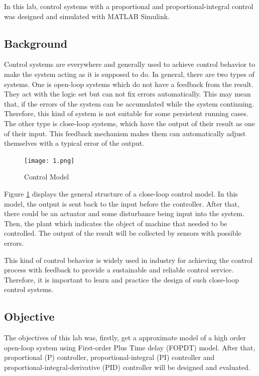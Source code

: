 \documentclass[11pt, a4paper]{article}
\begin{document}
In this lab, control systems with a proportional and proportional-integral control was designed and simulated with MATLAB Simulink.\cite{ref:lab} 

\subsection{Background}

Control systems are everywhere and generally used to achieve control behavior to make the system acting as it is supposed to do. In general, there are two types of systems. One is open-loop systems which do not have a feedback from the result. They act with the logic set but can not fix errors automatically. This may mean that, if the errors of the system can be accumulated while the system continuing. Therefore, this kind of system is not suitable for some persistent running cases. The other type is close-loop systems, which have the output of their result as one of their input. This feedback mechanism makes them can automatically adjust themselves with a typical error of the output.

\begin{figure}[htbp]     \begin{centering}
    \texttt{[image: 1.png]}
    \caption{\label{Fig:control}Control Model \cite{ref:lab}}
    \end{centering}
\end{figure}

Figure \ref{Fig:control} displays the general structure of a close-loop control model. In this model, the output is sent back to the input before the controller. After that, there could be an actuator and some disturbance being input into the system. Then, the plant which indicates the object of machine that needed to be controlled. The output of the result will be collected by sensors with possible errors.

This kind of control behavior is widely used in industry for achieving the control process with feedback to provide a sustainable and reliable control service. Therefore, it is important to learn and practice the design of such close-loop control systems.


\subsection{Objective}

The objectives of this lab was, firstly, get a approximate model of a high order open-loop system using First-order Plus Time delay (FOPDT) model. After that, proportional (P) controller, proportional-integral (PI) controller and proportional-integral-derivative (PID) controller will be designed and evaluated.
\end{document}
